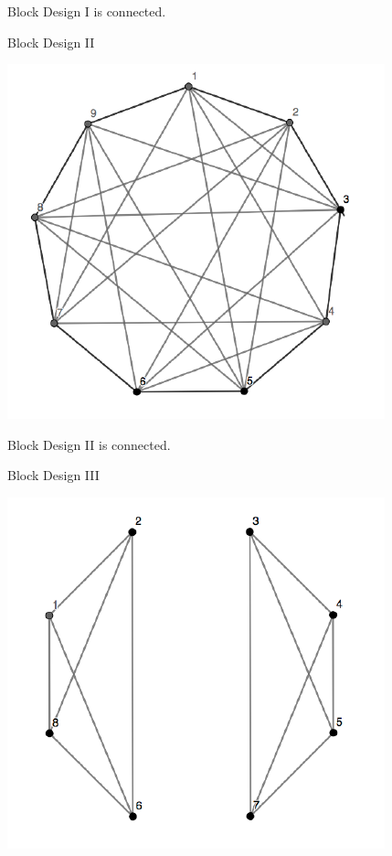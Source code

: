 \documentclass[12pt,]{article}
\begin{document}
Block Design I is connected.

\newpage

\begin{center}
Block Design II
\end{center}

\begin{center}\includegraphics{Markdown_HW_8_files/figure-latex/unnamed-chunk-8-1} \end{center}

Block Design II is connected.

\begin{center}
Block Design III
\end{center}

\begin{center}\includegraphics{Markdown_HW_8_files/figure-latex/unnamed-chunk-9-1} \end{center}
\end{document}
